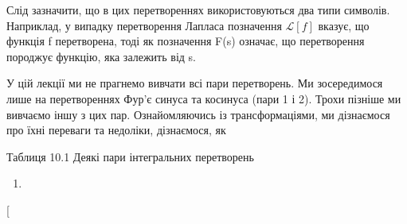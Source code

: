 \documentclass[
  ukrainian,
]{article}
\providecommand{\tightlist}{%
  \setlength{\itemsep}{0pt}\setlength{\parskip}{0pt}}
\begin{document}
Слід зазначити, що в цих перетвореннях використовуються два типи
символів. Наприклад, у випадку перетворення Лапласа позначення
\(\mathcal{L}[f]\) вказує, що функція f перетворена, тоді як позначення
F(s) означає, що перетворення породжує функцію, яка залежить від s.

У цій лекції ми не прагнемо вивчати всі пари перетворень. Ми
зосередимося лише на перетвореннях Фур'є синуса та косинуса (пари 1 і
2). Трохи пізніше ми вивчаємо іншу з цих пар. Ознайомляючись із
трансформаціями, ми дізнаємося про їхні переваги та недоліки,
дізнаємося, як

Таблиця 10.1 Деякі пари інтегральних перетворень

\begin{enumerate}
\def\labelenumi{\arabic{enumi}.}
\tightlist
\item
\end{enumerate}

{[}
\end{document}
